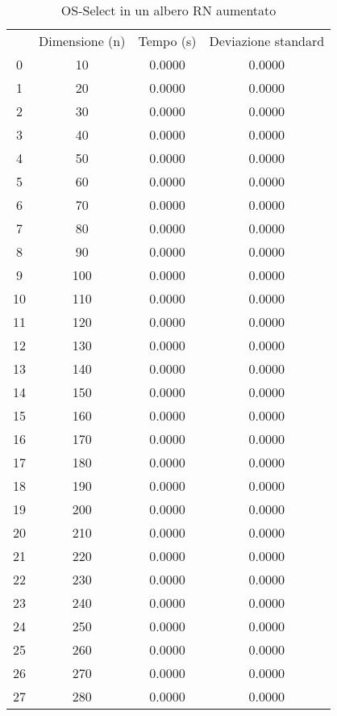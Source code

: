 \begin{table}
\centering
\caption{OS-Select in un albero RN aumentato}
\label{OS-Select in un albero RN aumentato}
\begin{adjustbox}{width=1\textwidth/2}
\begin{tabular}{|c|c|c|c|}
\hline
 & Dimensione (n) & Tempo (s) & Deviazione standard \\
0 & 10 & 0.0000 & 0.0000 \\
\cline{1-4}
1 & 20 & 0.0000 & 0.0000 \\
\cline{1-4}
2 & 30 & 0.0000 & 0.0000 \\
\cline{1-4}
3 & 40 & 0.0000 & 0.0000 \\
\cline{1-4}
4 & 50 & 0.0000 & 0.0000 \\
\cline{1-4}
5 & 60 & 0.0000 & 0.0000 \\
\cline{1-4}
6 & 70 & 0.0000 & 0.0000 \\
\cline{1-4}
7 & 80 & 0.0000 & 0.0000 \\
\cline{1-4}
8 & 90 & 0.0000 & 0.0000 \\
\cline{1-4}
9 & 100 & 0.0000 & 0.0000 \\
\cline{1-4}
10 & 110 & 0.0000 & 0.0000 \\
\cline{1-4}
11 & 120 & 0.0000 & 0.0000 \\
\cline{1-4}
12 & 130 & 0.0000 & 0.0000 \\
\cline{1-4}
13 & 140 & 0.0000 & 0.0000 \\
\cline{1-4}
14 & 150 & 0.0000 & 0.0000 \\
\cline{1-4}
15 & 160 & 0.0000 & 0.0000 \\
\cline{1-4}
16 & 170 & 0.0000 & 0.0000 \\
\cline{1-4}
17 & 180 & 0.0000 & 0.0000 \\
\cline{1-4}
18 & 190 & 0.0000 & 0.0000 \\
\cline{1-4}
19 & 200 & 0.0000 & 0.0000 \\
\cline{1-4}
20 & 210 & 0.0000 & 0.0000 \\
\cline{1-4}
21 & 220 & 0.0000 & 0.0000 \\
\cline{1-4}
22 & 230 & 0.0000 & 0.0000 \\
\cline{1-4}
23 & 240 & 0.0000 & 0.0000 \\
\cline{1-4}
24 & 250 & 0.0000 & 0.0000 \\
\cline{1-4}
25 & 260 & 0.0000 & 0.0000 \\
\cline{1-4}
26 & 270 & 0.0000 & 0.0000 \\
\cline{1-4}
27 & 280 & 0.0000 & 0.0000 \\

\end{tabular}
\end{adjustbox}
\end{table}
